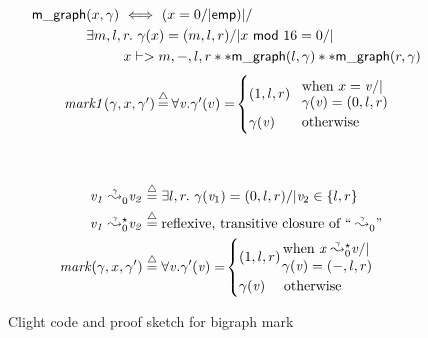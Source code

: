 \begin{figure}[t]
{\footnotesize
\begin{flushleft}
\begin{minipage}[c]{0.55\textwidth}
\begin{equation}
\label{eqn:bigraphintrofoldunfold}
\begin{split}
\quad \p{m\_graph}&(x, \gamma) ~ <=> ~ (x = 0 /| \p{emp}) |/ \null \\
& \exists m,l,r.~ \gamma(x)=(m,l,r) /| x~\mathsf{mod}~16 = 0 /| \null \\
& \qquad ~~ x |-> m,-,l,r ** \p{m\_graph}(l, \gamma) ** \p{m\_graph}(r, \gamma)
\end{split}
\end{equation}
\begin{equation*}
\begin{array}{l@{\hspace{2pt}}c@{\hspace{2pt}}l}
\quad \m{mark1}(\gamma,x,\gamma') & \defeq & \forall \m{v}. \gamma'(v) = \! \begin{cases}
(1,l,r) \! & \begin{array}{@{}l@{}}\text{when } x = \m{v} /| \null \\[-3pt] \gamma(\m{v}) = (0,l,r) \end{array} \\
\gamma(\m{v}) & \text{otherwise}
\end{cases}
\end{array}
\end{equation*}
\end{minipage}
~~ \vline
\begin{minipage}[c]{0.4\textwidth}
\begin{equation*}
\begin{split}
\reachable{v_1}{\gamma}{}{0}{v_2}\;\defeq\; &\exists l,r.~ \gamma(\m{v}_1) = (0,l,r) /| \m{v}_2 \in \{ l,r\} \\
\reachable{v_1}{\gamma}{\star}{0}{v_2}\;\defeq\;&\text{reflexive, transitive closure of ``} \reachable{}{\gamma}{}{0}{}\text{''}
\\
\;\; \m{mark}(\gamma,x,\gamma')\;\defeq\;&
\forall \m{v}. \gamma'(\m{v}) = \!
\begin{cases}
(1,l,r) \!
\begin{array}{@{}l@{}}\text{ when }
\reachable{x}{\gamma}{\star}{0}{v} /| \null \\[-2pt] \; \gamma(\m{v}) = (-,l,r)
\end{array}\\
\gamma(\m{v}) \quad \text{ otherwise}
\end{cases}
\end{split}
\end{equation*}
\end{minipage}
\end{flushleft}
}

\vspace{-0.4em}
\caption{Clight code and proof sketch for bigraph mark}
\label{fig:markgraph}
\vspace{-1em}
\end{figure}

